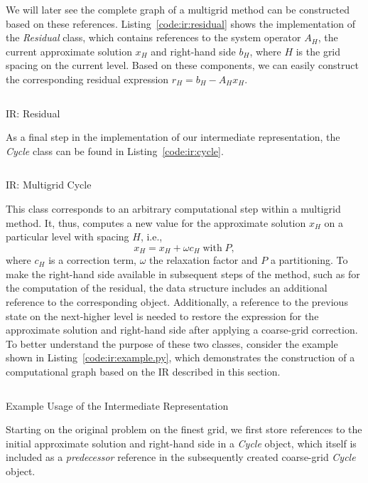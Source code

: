 We will later see the complete graph of a multigrid method can be constructed based on these references.
Listing~\ref{code:ir:residual} shows the implementation of the \emph{Residual} class, which contains references to the system operator $A_H$, the current approximate solution $x_H$ and right-hand side $b_H$, where $H$ is the grid spacing on the current level.
Based on these components, we can easily construct the corresponding residual expression $r_H = b_H - A_H x_H$.
\begin{listing}
	\inputminted{python}{evostencils/ir/residual.py}
	\caption{IR: Residual}
	\label{code:ir:residual}
\end{listing}
As a final step in the implementation of our intermediate representation, the \emph{Cycle} class can be found in Listing~\ref{code:ir:cycle}.
\begin{listing}
	\inputminted{python}{evostencils/ir/cycle.py}
	\caption{IR: Multigrid Cycle}
	\label{code:ir:cycle}
\end{listing}
This class corresponds to an arbitrary computational step within a multigrid method.
It, thus, computes a new value for the approximate solution $x_H$ on a particular level with spacing $H$, i.e.,
\begin{equation*}
	x_H = x_H + \omega c_H \; \text{with} \; P,
\end{equation*}
where $c_H$ is a correction term, $\omega$ the relaxation factor and $P$ a partitioning.
To make the right-hand side available in subsequent steps of the method, such as for the computation of the residual, the data structure includes an additional reference to the corresponding object.
Additionally, a reference to the previous state on the next-higher level is needed to restore the expression for the approximate solution and right-hand side after applying a coarse-grid correction.
To better understand the purpose of these two classes, consider the example shown in Listing~\ref{code:ir:example.py}, which demonstrates the construction of a computational graph based on the IR described in this section.
\begin{listing}
	\inputminted{python}{evostencils/ir/example.py}
	\caption{Example Usage of the Intermediate Representation}
	\label{code:ir:example.py}
\end{listing}
Starting on the original problem on the finest grid, we first store references to the initial approximate solution and right-hand side in a \emph{Cycle} object, which itself is included as a \emph{predecessor} reference in the subsequently created coarse-grid \emph{Cycle} object.
